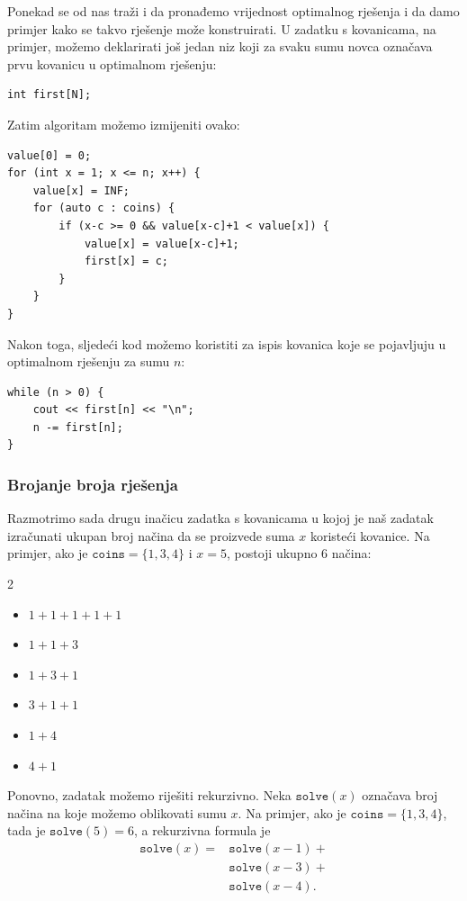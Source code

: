 Ponekad se od nas traži i da pronađemo vrijednost
optimalnog rješenja i da damo
primjer kako se takvo rješenje može konstruirati.
U zadatku s kovanicama, na primjer,
možemo deklarirati još jedan niz
koji za svaku sumu novca
označava prvu kovanicu
u optimalnom rješenju:
\begin{lstlisting}
int first[N];
\end{lstlisting}
Zatim algoritam možemo izmijeniti ovako:
\begin{lstlisting}
value[0] = 0;
for (int x = 1; x <= n; x++) {
    value[x] = INF;
    for (auto c : coins) {
        if (x-c >= 0 && value[x-c]+1 < value[x]) {
            value[x] = value[x-c]+1;
            first[x] = c;
        }
    }
}
\end{lstlisting}
Nakon toga, sljedeći kod možemo koristiti za
ispis kovanica koje se pojavljuju u optimalnom rješenju za
sumu $n$:
\begin{lstlisting}
while (n > 0) {
    cout << first[n] << "\n";
    n -= first[n];
}
\end{lstlisting}

\subsubsection{Brojanje broja rješenja}

Razmotrimo sada drugu inačicu
zadatka s kovanicama u kojoj je naš zadatak
izračunati ukupan broj načina
da se proizvede suma $x$ koristeći kovanice.
Na primjer, ako je $\texttt{coins}=\{1,3,4\}$ i
$x=5$, postoji ukupno 6 načina:

\begin{multicols}{2}
\begin{itemize}
\item $1+1+1+1+1$
\item $1+1+3$
\item $1+3+1$
\item $3+1+1$
\item $1+4$
\item $4+1$
\end{itemize}
\end{multicols}

Ponovno, zadatak možemo riješiti rekurzivno.
Neka $\texttt{solve}(x)$ označava broj načina
na koje možemo oblikovati sumu $x$.
Na primjer, ako je $\texttt{coins}=\{1,3,4\}$,
tada je $\texttt{solve}(5)=6$, a rekurzivna formula je
\begin{equation*}
\begin{split}
\texttt{solve}(x) = & \texttt{solve}(x-1) + \\
                    & \texttt{solve}(x-3) + \\
                    & \texttt{solve}(x-4)  .
\end{split}
\end{equation*}

